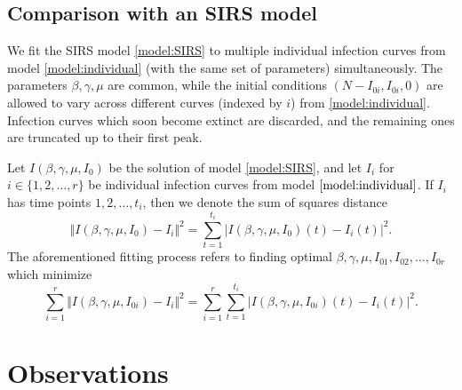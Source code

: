 \documentclass[11pt]{article}
\numberwithin{equation}{subsection}
\begin{document}
    \subsection{Comparison with an SIRS model}

    We fit the SIRS model \ref{model:SIRS} to multiple individual infection
    curves from model \ref{model:individual} (with the same set of parameters)
    simultaneously. The parameters $\beta, \gamma, \mu$ are common, while the
    initial conditions $(N - I_{0i}, I_{0i}, 0)$ are allowed to vary across
    different curves (indexed by $i$) from \ref{model:individual}.  Infection
    curves which soon become extinct are discarded, and the remaining ones are
    truncated up to their first peak.

    Let $I(\beta, \gamma, \mu, I_0)$ be the solution of model
    \ref{model:SIRS}, and let $I_i$ for $i \in \{1, 2, \dots, r\}$ be
    individual infection curves from model $\ref{model:individual}$. If $I_i$
    has time points $1, 2, \dots, t_i$, then we denote the sum of squares
    distance \[
        \Vert I(\beta, \gamma, \mu, I_0) - I_i \Vert^2 =
        \sum_{t = 1}^{t_i} |I(\beta, \gamma, \mu, I_0)(t) - I_i(t)|^2.
    \] The aforementioned fitting process refers to finding optimal $\beta,
    \gamma, \mu, I_{01}, I_{02}, \dots, I_{0r}$ which minimize \[
        \sum_{i = 1}^r \Vert I(\beta, \gamma, \mu, I_{0i}) - I_i \Vert^2 =
        \sum_{i = 1}^r \sum_{t = 1}^{t_i} |I(\beta, \gamma, \mu, I_{0i})(t) -
        I_i(t)|^2.
    \]


    \section{Observations}
\end{document}
